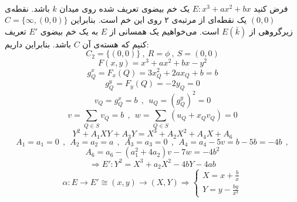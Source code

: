 \\
\example
فرض کنید 
$E:x^3+ax^2+bx$
یک خم بیضوی تعریف شده روی میدان 
$k$
باشد. نقطه‌ی 
$(0,0)$
یک نقطه‌ای از مرتبه‌ی ۲ روی این خم است. بنابراین
$C=\{ \infty , (0,0) \}$
زیرگروهی از
$E(\bar{k})$
است. می‌خواهیم یک همسانی از
$E$
به یک خم بیضوی
$E'$
تعریف کنیم که هسته‌ی آن
$C$
باشد. بنابراین داریم:
$$ C_2 = \{ (0,0) \} ~,~ R = \phi ~,~ S={(0,0)} $$
$$ F(x,y) = x^3+ax^2+bx-y^2 $$
$$ g^x_Q = F_x(Q) = 3x^2_Q + 2ax_Q + b = b $$
$$ g^y_Q  = F_y(Q) = -2y_Q = 0$$
$$ v_Q = g^x_Q = b ~~,~~ u_Q=(g^y_Q)^2 = 0 $$
$$ v = \sum\limits^{}_{Q \in S} v_Q = b ~~,~~ w = \sum\limits^{}_{Q \in S}(u_Q + x_Qv_Q) = 0$$
$$ Y^2+A_1XY+A_3Y = X^3+A_ 2X^2+A_4X+A_6$$
$$ A_1=a_1=0 ~~,~~ A_2=a_2=a ~~,~~ A_3=a_3=0 ~~,~~ A_4=a_4-5v = b-5b = -4b ~~,$$
$$ A_6 = a_6-(a^2_1 + 4a_2)v-7w = -4b^2$$
$$ \Longrightarrow E': Y^2=X^3+a_2X^2-4bY-4ab $$
$$  $$
\begin{equation*}
\alpha : E \longrightarrow E' \cong (x,y) \longrightarrow (X,Y) \Rightarrow
\begin{cases}
X = x + \frac{b}{x} \\
Y = y - \frac{by}{x^2}
\end{cases}
\end{equation*}
